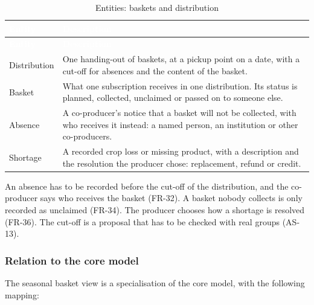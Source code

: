 \documentclass[11pt,a4paper]{article}
\begin{document}
{\footnotesize
\begin{longtable}{>{\raggedright\arraybackslash\hspace{0pt}}p{}>{\raggedright\arraybackslash\hspace{0pt}}p{}}
\caption{Entities: baskets and distribution}\\
\rowcolor{hdr}\textcolor{white}{\textbf{Entity}} & \textcolor{white}{\textbf{Description}} \\ \endfirsthead
\rowcolor{hdr}\textcolor{white}{\textbf{Entity}} & \textcolor{white}{\textbf{Description}} \\ \endhead
Distribution & One handing-out of baskets, at a pickup point on a date, with a cut-off for absences and the content of the basket. \\ \hline
Basket & What one subscription receives in one distribution. Its status is planned, collected, unclaimed or passed on to someone else. \\ \hline
Absence & A co-producer's notice that a basket will not be collected, with who receives it instead: a named person, an institution or other co-producers. \\ \hline
Shortage & A recorded crop loss or missing product, with a description and the resolution the producer chose: replacement, refund or credit. \\ \hline
\end{longtable}}
An absence has to be recorded before the cut-off of the distribution, and the co-producer says who receives the basket (FR-32). A basket nobody collects is only recorded as unclaimed (FR-34). The producer chooses how a shortage is resolved (FR-36). The cut-off is a proposal that has to be checked with real groups (AS-13).


\subsubsection{Relation to the core model}

The seasonal basket view is a specialisation of the core model, with the following mapping:
\end{document}
